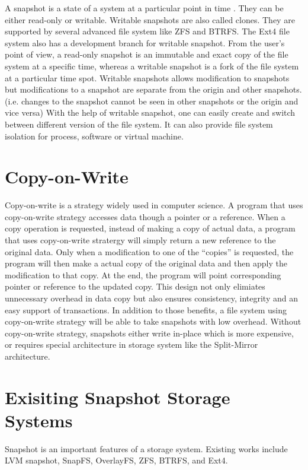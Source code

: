     A snapshot is a state of a system at a particular point in time \cite{btrfscow}. They can be either read-only or writable. Writable snapshots are also called clones. They are supported by several advanced file system like ZFS and BTRFS. The Ext4 file system also has a development branch for writable snapshot. From the user’s point of view, a read-only snapshot is an immutable and exact copy of the file system at a specific time, whereas a writable snapshot is a fork of the file system at a particular time spot. Writable snapshots allows modification to snapshots but modifications to a snapshot are separate from the origin and other snapshots. (i.e. changes to the snapshot cannot be seen in other snapshots or the origin and vice versa) With the help of writable snapshot, one can easily create and switch between different version of the file system. It can also provide file system isolation for process, software or virtual machine.

\section{Copy-on-Write}

    Copy-on-write is a strategy widely used in computer science. A program that uses copy-on-write strategy accesses data though a pointer or a reference. When a copy operation is requested, instead of making a copy of actual data, a program that uses copy-on-write stratergy will simply return a new reference to the original data. Only when a modification to one of the ``copies'' is requested, the program will then make a actual copy of the original data and then apply the modification to that copy. At the end, the program will point corresponding pointer or reference to the updated copy. This design not only elimiates unnecessary overhead in data copy but also ensures consistency, integrity and an easy support of transactions. In addition to those benefits, a file system using copy-on-write strategy will be able to take snapshots with low overhead. Without copy-on-write strategy, snapshots either write in-place which is more expensive, or requires special architecture in storage system like the Split-Mirror architecture.

\section{Exisiting Snapshot Storage Systems}

    Snapshot is an important features of a storage system. Existing works include LVM snapshot, SnapFS, OverlayFS, ZFS, BTRFS, and Ext4.
    
